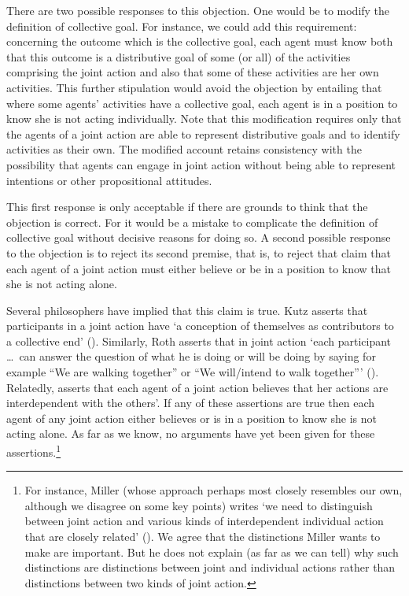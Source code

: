 \documentclass[12pt,a4paper]{extarticle}
\begin{document}
There are two possible responses to this objection.  One would be to modify the definition of collective goal.
For instance, we could add this requirement: concerning the outcome which is the collective goal, each agent must know both that 
	this outcome is a distributive goal of some (or all) of the activities comprising the joint action 
	and also that 
	some of these activities are her own activities.
This further stipulation would avoid the objection by entailing that where some agents' activities have a collective goal, each agent is in a position to know she is not acting individually.
Note that this modification requires only that the agents of a joint action are able to represent distributive goals and to identify activities as their own.
The modified account retains consistency with the possibility that agents can engage in joint action without being able to represent intentions or other propositional attitudes.

This first response is only acceptable if there are grounds to think that the objection is correct.  
For it would be a mistake to complicate the definition of collective goal  without decisive reasons for doing so.
A second possible response to the objection is to reject its second premise, 
	that is,
	to reject that claim that each agent of a joint action must either believe or be in a position to know that she is not acting alone.
	
Several philosophers have  implied that this claim is true.  
Kutz asserts that participants in a joint action have 
`a conception of themselves as contributors to a collective end' (\citeyear[p.\ 10]{Kutz:2000si}).
Similarly, Roth asserts that in joint action `each participant \ldots \ can answer the question of what he is doing or will be doing by saying for example ``We are walking together'' or ``We will/intend to walk together''' 
(\citeyear[p.\ 361]{Roth:2004ki}).
Relatedly, \citet[p. 56]{miller_social_2001} asserts that each agent of a joint action believes that her actions are interdependent with the others'.
If any of these assertions are true then each agent of any joint action either believes or is in a position to know she is not acting alone.
As far as we know, no arguments have yet been given for these assertions.\footnote{
For instance, Miller (whose approach perhaps most closely resembles our own, although we disagree on some key points) writes `we need to distinguish between joint action and various kinds of interdependent individual action that are closely related' (\citeyear[p. 56]{miller_social_2001}).
We agree that the distinctions Miller wants to make are important.
But he does not explain (as far as we can tell) why such distinctions are distinctions between joint and individual actions rather than distinctions between two kinds of joint action.
}
\end{document}
